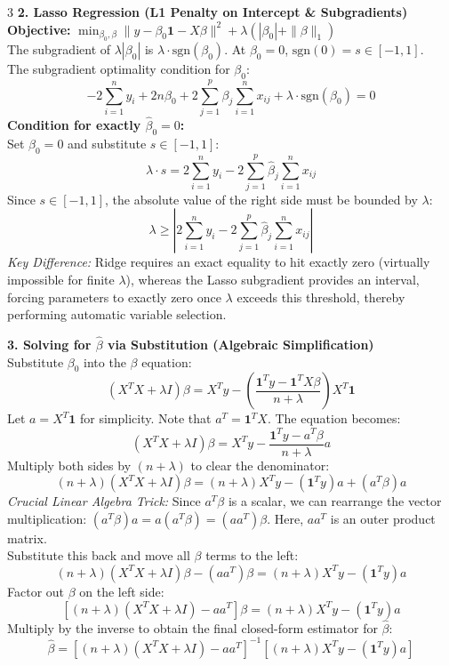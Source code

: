 \documentclass[10pt,landscape]{article}
\begin{document}
\begin{multicols*}{3}
\textbf{2. Lasso Regression (L1 Penalty on Intercept \& Subgradients)} \\
\textbf{Objective:} $\min_{\beta_0, \beta} \|y - \beta_0 \mathbf{1} - X\beta\|^2 + \lambda(|\beta_0| + \|\beta\|_1)$ \\
The subgradient of $\lambda|\beta_0|$ is $\lambda \cdot \text{sgn}(\beta_0)$. At $\beta_0 = 0$, $\text{sgn}(0) = s \in [-1, 1]$. \\
The subgradient optimality condition for $\beta_0$:
$$ -2\sum_{i=1}^n y_i + 2n\beta_0 + 2\sum_{j=1}^p \beta_j \sum_{i=1}^n x_{ij} + \lambda \cdot \text{sgn}(\beta_0) = 0 $$
\textbf{Condition for exactly $\hat{\beta}_0 = 0$:} \\
Set $\beta_0 = 0$ and substitute $s \in [-1, 1]$:
$$ \lambda \cdot s = 2\sum_{i=1}^n y_i - 2\sum_{j=1}^p \hat{\beta}_j \sum_{i=1}^n x_{ij} $$
Since $s \in [-1, 1]$, the absolute value of the right side must be bounded by $\lambda$:
$$ \lambda \ge \left| 2\sum_{i=1}^n y_i - 2\sum_{j=1}^p \hat{\beta}_j \sum_{i=1}^n x_{ij} \right| $$
\textit{Key Difference:} Ridge requires an exact equality to hit exactly zero (virtually impossible for finite $\lambda$), whereas the Lasso subgradient provides an interval, forcing parameters to exactly zero once $\lambda$ exceeds this threshold, thereby performing automatic variable selection.

\textbf{3. Solving for $\hat{\beta}$ via Substitution (Algebraic Simplification)} \\
Substitute $\beta_0$ into the $\beta$ equation:
$$ (X^T X + \lambda I)\beta = X^T y - \left( \frac{\mathbf{1}^T y - \mathbf{1}^T X \beta}{n + \lambda} \right) X^T \mathbf{1} $$
Let $a = X^T \mathbf{1}$ for simplicity. Note that $a^T = \mathbf{1}^T X$. The equation becomes:
$$ (X^T X + \lambda I)\beta = X^T y - \frac{\mathbf{1}^T y - a^T \beta}{n + \lambda} a $$
Multiply both sides by $(n + \lambda)$ to clear the denominator:
$$ (n + \lambda)(X^T X + \lambda I)\beta = (n + \lambda)X^T y - (\mathbf{1}^T y)a + (a^T \beta)a $$
\textit{Crucial Linear Algebra Trick:} Since $a^T \beta$ is a scalar, we can rearrange the vector multiplication: $(a^T \beta)a = a(a^T \beta) = (aa^T)\beta$. Here, $aa^T$ is an outer product matrix. \\
Substitute this back and move all $\beta$ terms to the left:
$$ (n + \lambda)(X^T X + \lambda I)\beta - (aa^T)\beta = (n + \lambda)X^T y - (\mathbf{1}^T y)a $$
Factor out $\beta$ on the left side:
$$ \left[ (n + \lambda)(X^T X + \lambda I) - aa^T \right]\beta = (n + \lambda)X^T y - (\mathbf{1}^T y)a $$
Multiply by the inverse to obtain the final closed-form estimator for $\hat{\beta}$:
$$ \hat{\beta} = \left[ (n + \lambda)(X^T X + \lambda I) - aa^T \right]^{-1} \left[ (n + \lambda)X^T y - (\mathbf{1}^T y)a \right] $$


\end{multicols*}
\end{document}
